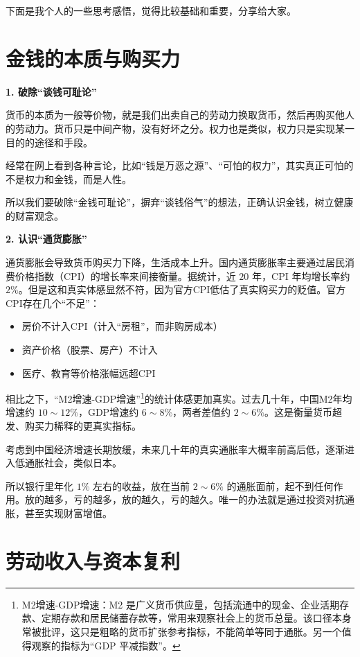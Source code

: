 \documentclass[12pt,openany]{book}
\newcommand{\subhead}[1]{%
    \par\vspace{0.5\baselineskip}%
    \noindent\textbf{#1}\par%
    \vspace{0.5\baselineskip}%
}
\begin{document}
下面是我个人的一些思考感悟，觉得比较基础和重要，分享给大家。

\section{金钱的本质与购买力}

\subhead{1. 破除“谈钱可耻论”}

货币的本质为一般等价物，就是我们出卖自己的劳动力换取货币，然后再购买他人的劳动力。货币只是中间产物，没有好坏之分。权力也是类似，权力只是实现某一目的的途径和手段。

经常在网上看到各种言论，比如“钱是万恶之源”、“可怕的权力”，其实真正可怕的不是权力和金钱，而是人性。

所以我们要破除“金钱可耻论”，摒弃“谈钱俗气”的想法，正确认识金钱，树立健康的财富观念。

\subhead{2. 认识“通货膨胀”}

通货膨胀会导致货币购买力下降，生活成本上升。国内通货膨胀率主要通过居民消费价格指数（CPI）的增长率来间接衡量。据统计，近 $20$ 年，CPI 年均增长率约 $2\%$。但是这和真实体感显然不符，因为官方CPI低估了真实购买力的贬值。官方CPI存在几个“不足”：
\begin{itemize}
    \item 房价不计入CPI（计入“房租”，而非购房成本）
    \item 资产价格（股票、房产）不计入
    \item 医疗、教育等价格涨幅远超CPI
\end{itemize}

相比之下，“M2增速-GDP增速”\footnote{M2增速-GDP增速：M2 是广义货币供应量，包括流通中的现金、企业活期存款、定期存款和居民储蓄存款等，常用来观察社会上的货币总量。该口径本身常被批评，这只是粗略的货币扩张参考指标，不能简单等同于通胀。另一个值得观察的指标为“GDP 平减指数”。}的统计体感更加真实。过去几十年，中国M2年均增速约 $10\sim 12\%$，GDP增速约 $6\sim 8\%$，两者差值约 $2\sim 6\%$。这是衡量货币超发、购买力稀释的更真实指标。

考虑到中国经济增速长期放缓，未来几十年的真实通胀率大概率前高后低，逐渐进入低通胀社会，类似日本。

所以银行里年化 $1\%$ 左右的收益，放在当前 $2\sim 6\%$ 的通胀面前，起不到任何作用。放的越多，亏的越多，放的越久，亏的越久。唯一的办法就是通过投资对抗通胀，甚至实现财富增值。

\section{劳动收入与资本复利}
\end{document}
